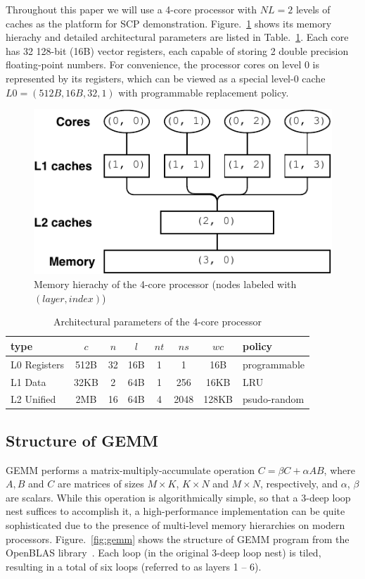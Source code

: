 Throughout this paper we will use a 4-core processor with
$NL=2$ levels of caches as the platform for SCP demonstration.
Figure.~\ref{fig:hierachy} shows its memory hierachy and
detailed architectural parameters are listed in Table.~\ref{tab:cluster}.
Each core has 32 128-bit (16B) vector registers,
each capable of storing 2 double precision floating-point numbers.
For convenience, the processor cores on level 0
is represented by its registers, which can be viewed as a special
level-0 cache $L0 = (512B, 16B, 32, 1)$ with programmable replacement policy.

\begin{figure}
  \centering
  \includegraphics[width=.45\textwidth]{figures/cluster-new}
  \caption{Memory hierachy of the 4-core processor
    (nodes labeled with $(layer,index)$)}
  \label{fig:hierachy}
\end{figure}

\begin{table}
  \centering
  \caption{Architectural parameters of the 4-core processor}
  \label{tab:cluster}
  \begin{tabular}{lccccccl}
    \toprule
    type & $c$ & $n$ & $l$ & $nt$ & $ns$ & $wc$ & policy \\
    \midrule
    L0 Registers  & 512B & 32 & 16B & 1 & 1 & 16B & programmable \\
    L1 Data    & 32KB & 2  & 64B & 1 & 256 & 16KB & LRU \\
    L2 Unified & 2MB  & 16 & 64B & 4 & 2048 & 128KB & psudo-random \\
    \bottomrule
  \end{tabular}
\end{table}

\subsection{Structure of GEMM}\label{subsec:gemm}

GEMM performs a matrix-multiply-accumulate operation $C = \beta C + \alpha A B$,
where $A, B$ and $C$ are matrices of sizes
$M \times K$, $K \times N$ and $M \times N$, respectively,
and $\alpha$, $\beta$ are scalars.
While this operation is algorithmically simple,
so that a 3-deep loop nest suffices to accomplish it,
a high-performance implementation can be quite
sophisticated due to the presence of multi-level memory
hierarchies on modern processors.
Figure.~\ref{fig:gemm} shows the structure of GEMM program from
the OpenBLAS library~\cite{openblas}.
Each loop (in the original 3-deep loop nest) is tiled,
resulting in a total of six loops (referred to as layers 1 -- 6).

